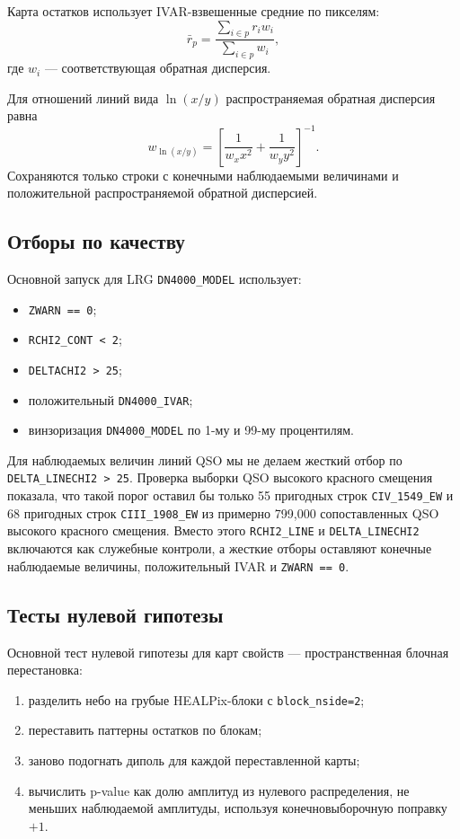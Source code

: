 \documentclass[11pt]{article}
\begin{document}
Карта остатков использует IVAR-взвешенные средние по пикселям:
\begin{equation}
    \bar{r}_p =
    \frac{\sum_{i\in p} r_i w_i}{\sum_{i\in p} w_i},
\end{equation}
где $w_i$ — соответствующая обратная дисперсия.

Для отношений линий вида $\ln(x/y)$ распространяемая обратная дисперсия равна
\begin{equation}
    w_{\ln(x/y)}
    =
    \left[
    \frac{1}{w_x x^2}
    +
    \frac{1}{w_y y^2}
    \right]^{-1}.
\end{equation}
Сохраняются только строки с конечными наблюдаемыми величинами и положительной распространяемой обратной дисперсией.

\subsection{Отборы по качеству}

Основной запуск для LRG \texttt{DN4000\_MODEL} использует:
\begin{itemize}
    \item \texttt{ZWARN == 0};
    \item \texttt{RCHI2\_CONT < 2};
    \item \texttt{DELTACHI2 > 25};
    \item положительный \texttt{DN4000\_IVAR};
    \item винзоризация \texttt{DN4000\_MODEL} по 1-му и 99-му процентилям.
\end{itemize}

Для наблюдаемых величин линий QSO мы не делаем жесткий отбор по \texttt{DELTA\_LINECHI2 > 25}. Проверка выборки QSO высокого красного смещения показала, что такой порог оставил бы только 55 пригодных строк \texttt{CIV\_1549\_EW} и 68 пригодных строк \texttt{CIII\_1908\_EW} из примерно 799,000 сопоставленных QSO высокого красного смещения. Вместо этого \texttt{RCHI2\_LINE} и \texttt{DELTA\_LINECHI2} включаются как служебные контроли, а жесткие отборы оставляют конечные наблюдаемые величины, положительный IVAR и \texttt{ZWARN == 0}.

\subsection{Тесты нулевой гипотезы}

Основной тест нулевой гипотезы для карт свойств — пространственная блочная перестановка:
\begin{enumerate}
    \item разделить небо на грубые HEALPix-блоки с \texttt{block\_nside=2};
    \item переставить паттерны остатков по блокам;
    \item заново подогнать диполь для каждой переставленной карты;
    \item вычислить p-value как долю амплитуд из нулевого распределения, не меньших наблюдаемой амплитуды, используя конечновыборочную поправку $+1$.
\end{enumerate}
\end{document}
